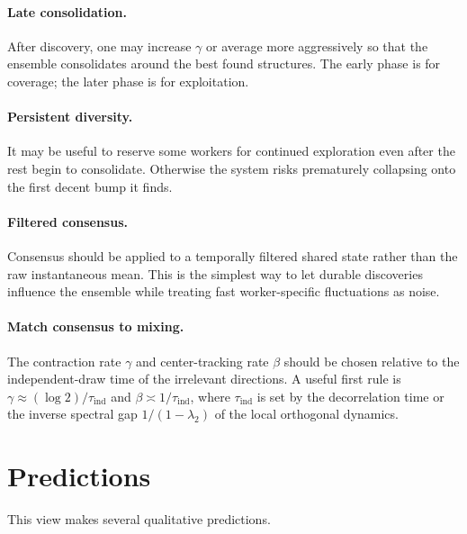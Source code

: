 \documentclass{article}
\begin{document}
\paragraph{Late consolidation.}
After discovery, one may increase $\gamma$ or average more aggressively
so that the ensemble consolidates around the best found structures. The
early phase is for coverage; the later phase is for exploitation.

\paragraph{Persistent diversity.}
It may be useful to reserve some workers for continued exploration even
after the rest begin to consolidate. Otherwise the system risks
prematurely collapsing onto the first decent bump it finds.

\paragraph{Filtered consensus.}
Consensus should be applied to a temporally filtered shared state rather
than the raw instantaneous mean. This is the simplest way to let
durable discoveries influence the ensemble while treating fast
worker-specific fluctuations as noise.

\paragraph{Match consensus to mixing.}
The contraction rate $\gamma$ and center-tracking rate $\beta$ should be
chosen relative to the independent-draw time of the irrelevant
directions. A useful first rule is
$\gamma \approx (\log 2)/\tau_{\mathrm{ind}}$ and
$\beta \asymp 1/\tau_{\mathrm{ind}}$, where
$\tau_{\mathrm{ind}}$ is set by the decorrelation time or the inverse
spectral gap $1/(1-\lambda_2)$ of the local orthogonal dynamics.

\section{Predictions}

This view makes several qualitative predictions.
\end{document}
